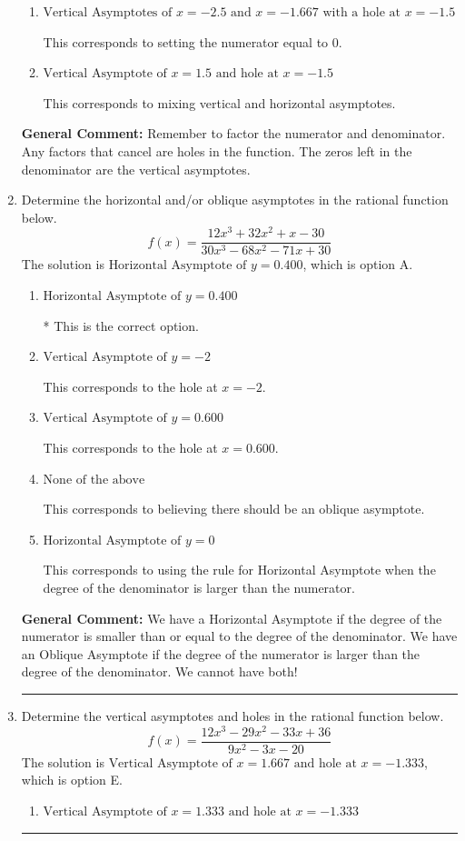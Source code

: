 \documentclass{extbook}[14pt]
\newcommand{\litem}[1]{\item #1

\rule{\textwidth}{0.4pt}}
\begin{document}
\begin{enumerate}
{\begin{enumerate}[label=\Alph*.]
This is the correct answer.
\item \( \text{Vertical Asymptotes of } x = -2.5 \text{ and } x = -1.667 \text{ with a hole at } x = -1.5 \)

This corresponds to setting the numerator equal to 0.
\item \( \text{Vertical Asymptote of } x = 1.5 \text{ and hole at } x = -1.5 \)

This corresponds to mixing vertical and horizontal asymptotes.
\end{enumerate}

\textbf{General Comment:} Remember to factor the numerator and denominator. Any factors that cancel are holes in the function. The zeros left in the denominator are the vertical asymptotes.
}
\litem{
Determine the horizontal and/or oblique asymptotes in the rational function below.
\[ f(x) = \frac{12x^{3} +32 x^{2} +x -30}{30x^{3} -68 x^{2} -71 x + 30} \]The solution is \( \text{Horizontal Asymptote of } y = 0.400  \), which is option A.\begin{enumerate}[label=\Alph*.]
\item \( \text{Horizontal Asymptote of } y = 0.400  \)

* This is the correct option.
\item \( \text{Vertical Asymptote of } y = -2  \)

This corresponds to the hole at $x = -2$.
\item \( \text{Vertical Asymptote of } y = 0.600  \)

This corresponds to the hole at $x = 0.600$.
\item \( \text{None of the above} \)

This corresponds to believing there should be an oblique asymptote.
\item \( \text{Horizontal Asymptote of } y = 0  \)

This corresponds to using the rule for Horizontal Asymptote when the degree of the denominator is larger than the numerator.
\end{enumerate}

\textbf{General Comment:} We have a Horizontal Asymptote if the degree of the numerator is smaller than or equal to the degree of the denominator. We have an Oblique Asymptote if the degree of the numerator is larger than the degree of the denominator. We cannot have both!
}
\litem{
Determine the vertical asymptotes and holes in the rational function below.
\[ f(x) = \frac{12x^{3} -29 x^{2} -33 x + 36}{9x^{2} -3 x -20} \]The solution is \( \text{Vertical Asymptote of } x = 1.667 \text{ and hole at } x = -1.333 \), which is option E.\begin{enumerate}[label=\Alph*.]
\item \( \text{Vertical Asymptote of } x = 1.333 \text{ and hole at } x = -1.333 \)


\end{enumerate}}
\end{enumerate}
\end{document}
